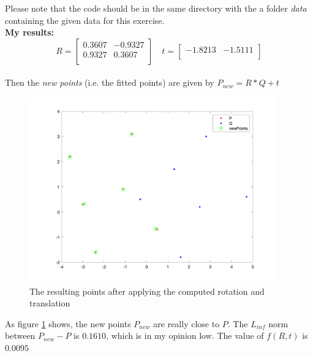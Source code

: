 \documentclass[12pt]{article}
\begin{document}
Please note that the code should be in the same directory with the a folder \textit{data} containing the given data for this exercise. \\

\textbf{My results:} \\

$$R = 
\begin{bmatrix}
	  0.3607 &  -0.9327 \\
    0.9327  &  0.3607 \\
\end{bmatrix}
\quad
t = \begin{bmatrix}
	 -1.8213 & 
   -1.5111 \\
\end{bmatrix}
$$
\\

Then the \textit{new points} (i.e. the fitted points) are given by $P_{new} = R*Q + t$

\begin{figure}[h]
\centering
\includegraphics[width=0.95\textwidth]{ex2_result}
\caption{The resulting points after applying the computed rotation and translation}
\label{fig:ex2}
\end{figure}

As figure \ref{fig:ex2} shows, the new points $P_{new}$ are really close to $P$. The $L_{inf}$ norm between $P_{new} - P$ is $0.1610$, which is in my opinion low. The value of $f(R, t)$ is $0.0095$\\
\end{document}
